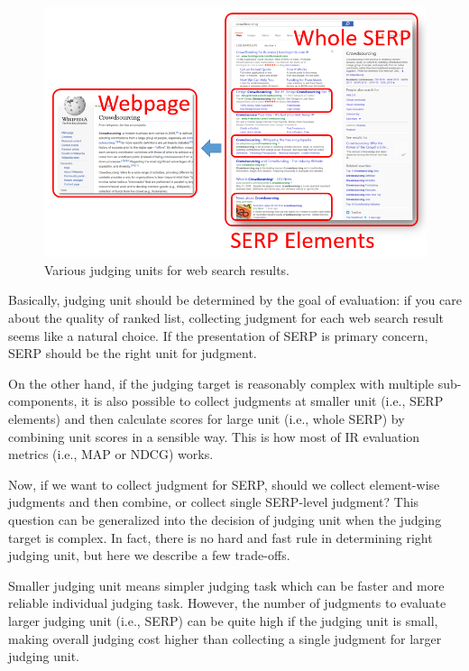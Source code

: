 \documentclass[openany]{now} %
\begin{document}
\begin{figure}
	\begin{center}
		\includegraphics[scale=0.5]{images/judging_units}
		\caption{Various judging units for web search results.} 
		\label{fig:judging_units}
	\end{center}
\end{figure}

Basically, judging unit should be determined by the goal of evaluation: if you care about the quality of ranked list, collecting judgment for each web search result seems like a natural choice. If the presentation of SERP is primary concern, SERP should be the right unit for judgment. 

On the other hand, if the judging target is reasonably complex with multiple sub-components, it is also possible to collect judgments at smaller unit (i.e., SERP elements) and then calculate scores for large unit (i.e., whole SERP) by combining unit scores in a sensible way. This is how most of IR evaluation metrics (i.e., MAP or NDCG) works.

Now, if we want to collect judgment for SERP, should we collect element-wise judgments and then combine, or collect single SERP-level judgment? This question can be generalized into the decision of judging unit when the judging target is complex. In fact, there is no hard and fast rule in determining right judging unit, but here we describe a few trade-offs. 

Smaller judging unit means simpler judging task which can be faster and more reliable individual judging task. However, the number of judgments to evaluate larger judging unit (i.e., SERP) can be quite high if the judging unit is small, making overall judging cost higher than collecting a single judgment for larger judging unit.
\end{document}

